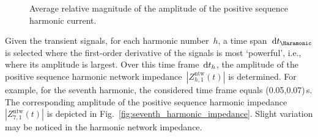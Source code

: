 \begin{figure}[t!]
    \centering
    \caption{Average relative magnitude of the amplitude of the positive sequence harmonic current.}
    \label{fig:relative_magnitude}
\end{figure}

Given the transient signals, for each harmonic number~$h$, a time span~$\mathrm{d}t_{\Haramonic}$ is selected where the first-order derivative of the signals is most `powerful', i.e., where its amplitude is largest. Over this time frame~$\mathrm{d}t_{h}$, the amplitude of the positive sequence harmonic network impedance~$|Z^{\text{ntw}}_{h,1}(t)|$ is determined. For example, for the seventh harmonic, the considered time frame equals (0.05,0.07)\,s. The corresponding amplitude of the positive sequence harmonic impedance~$|Z^{\text{ntw}}_{7,1}(t)|$ is depicted in Fig.~\ref{fig:seventh_harmonic_impedance}. Slight variation may be noticed in the harmonic network impedance.

